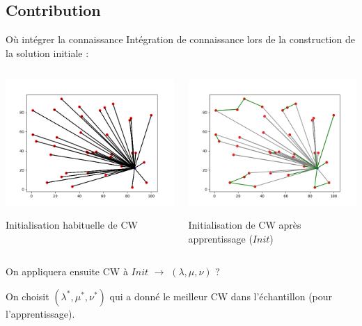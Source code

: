 \documentclass{beamer}
\begin{document}
\subsection{Contribution}

\begin{frame}{Où intégrer la connaissance}
Intégration de connaissance lors de la construction de la solution initiale :
\begin{columns}[t]

  \begin{column}{4cm}
  	\centering
	\includegraphics[scale=0.27]{CWinit.png}
 
 	Initialisation habituelle de CW
  \end{column}
  
 
  \begin{column}{4cm}
  	\centering
	\includegraphics[scale=0.27]{learning.png}
	
	Initialisation de CW après apprentissage ($Init$)
  \end{column}
\end{columns}

On appliquera ensuite CW à $Init$ $\rightarrow$ $(\lambda,\mu,\nu)$ ?

On choisit $(\lambda^*,\mu^*,\nu^*)$ qui a donné le meilleur CW dans l'échantillon (pour l'apprentissage). 
\end{frame}
\end{document}
